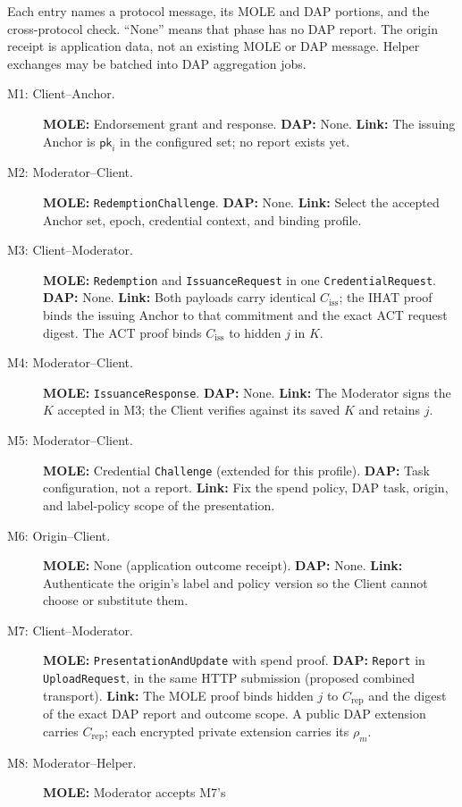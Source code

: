 \documentclass[11pt]{article}
\newcommand{\Ciss}{C_{\mathrm{iss}}}
\newcommand{\Crep}{C_{\mathrm{rep}}}
\begin{document}
Each entry names a protocol message, its MOLE and DAP portions, and the
cross-protocol check. ``None'' means that phase has no DAP report. The
origin receipt is application data, not an existing MOLE or DAP message.
Helper exchanges may be batched into DAP aggregation jobs.

\begin{description}
\item[M1: Client--Anchor.] \textbf{MOLE:} Endorsement grant and response.
  \textbf{DAP:} None. \textbf{Link:} The issuing Anchor is
  $\mathsf{pk}_i$ in the configured set; no report exists yet.
\item[M2: Moderator--Client.] \textbf{MOLE:} \texttt{RedemptionChallenge}.
  \textbf{DAP:} None. \textbf{Link:} Select the accepted Anchor set,
  epoch, credential context, and binding profile.
\item[M3: Client--Moderator.] \textbf{MOLE:} \texttt{Redemption} and
  \texttt{IssuanceRequest} in one \texttt{CredentialRequest}.
  \textbf{DAP:} None. \textbf{Link:} Both payloads carry identical
  $\Ciss$; the IHAT proof binds the issuing Anchor to that commitment and
  the exact ACT request digest. The ACT proof binds $\Ciss$ to hidden $j$
  in $K$.
\item[M4: Moderator--Client.] \textbf{MOLE:} \texttt{IssuanceResponse}.
  \textbf{DAP:} None. \textbf{Link:} The Moderator signs the $K$ accepted
  in M3; the Client verifies against its saved $K$ and retains $j$.
\item[M5: Moderator--Client.] \textbf{MOLE:} Credential \texttt{Challenge}
  (extended for this profile). \textbf{DAP:} Task configuration, not a
  report. \textbf{Link:} Fix the spend policy, DAP task, origin, and
  label-policy scope of the presentation.
\item[M6: Origin--Client.] \textbf{MOLE:} None (application outcome receipt).
  \textbf{DAP:} None. \textbf{Link:} Authenticate the origin's label and
  policy version so the Client cannot choose or substitute them.
\item[M7: Client--Moderator.] \textbf{MOLE:}
  \texttt{PresentationAndUpdate} with spend proof.
  \textbf{DAP:} \texttt{Report} in \texttt{UploadRequest}, in the same HTTP
  submission (proposed combined transport). \textbf{Link:} The MOLE
  proof binds hidden $j$ to $\Crep$ and the digest of the exact DAP report
  and outcome scope. A public DAP extension carries $\Crep$; each encrypted
  private extension carries its $\rho_m$.
\item[M8: Moderator--Helper.] \textbf{MOLE:} Moderator accepts M7's

\end{description}
\end{document}
